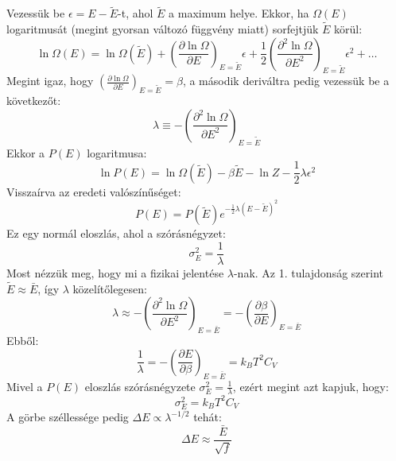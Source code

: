 \documentclass[../main.tex]{subfiles}
\begin{document}
Vezessük be $\epsilon = E - \tilde{E}$-t, ahol $\tilde{E}$ a maximum helye. Ekkor, ha $\Omega(E)$ logaritmusát (megint gyorsan változó függvény miatt) sorfejtjük $\tilde{E}$ körül:
\begin{equation}
    \ln \Omega(E) = \ln \Omega(\tilde{E}) + \left( \frac{\partial \ln \Omega}{\partial E} \right)_{E = \tilde{E}} \epsilon + \frac{1}{2} \left( \frac{\partial^2 \ln \Omega}{\partial E^2} \right)_{E = \tilde{E}} \epsilon^2 + \ldots
\end{equation}
Megint igaz, hogy $\left( \frac{\partial \ln \Omega}{\partial E} \right)_{E = \tilde{E}} = \beta$, a második deriváltra pedig vezessük be a következőt:
\begin{equation}
    \lambda \equiv - \left( \frac{\partial^2 \ln \Omega}{\partial E^2} \right)_{E = \tilde{E}}
\end{equation}
Ekkor a $P(E)$ logaritmusa:
\begin{equation}
    \ln P(E) = \ln \Omega(\tilde{E}) - \beta \tilde{E} - \ln Z - \frac{1}{2} \lambda \epsilon^2
\end{equation}
Visszaírva az eredeti valószínűséget:
\begin{equation}
    P(E) = P(\tilde{E}) e^{- \frac{1}{2} \lambda (E - \tilde{E})^2}
\end{equation}
Ez egy normál eloszlás, ahol a szórásnégyzet:
\begin{equation}
    \sigma_E^2 = \frac{1}{\lambda}
\end{equation}
Most nézzük meg, hogy mi a fizikai jelentése $\lambda$-nak. Az 1. tulajdonság szerint $\tilde{E} \approx \bar{E}$, így $\lambda$ közelítőlegesen:
\begin{equation}
    \lambda \approx - \left( \frac{\partial^2 \ln \Omega}{\partial E^2} \right)_{E = \bar{E}} = - \left( \frac{\partial \beta}{\partial E} \right)_{E = \bar{E}}
\end{equation}
Ebből:
\begin{equation}
    \frac{1}{\lambda} = - \left( \frac{\partial E}{\partial \beta} \right)_{E = \bar{E}} = k_B T^2 C_V
\end{equation}
Mivel a $P(E)$ eloszlás szórásnégyzete $\sigma_E^2 = \frac{1}{\lambda}$, ezért megint azt kapjuk, hogy:
\begin{equation}
    \sigma_E^2 = k_B T^2 C_V
\end{equation}
A görbe széllessége pedig $\Delta E \propto \lambda ^{-1/2}$ tehát:
\begin{equation}
    \Delta E \approx \frac{\bar{E}}{\sqrt{f}}
\end{equation}
\end{document}
